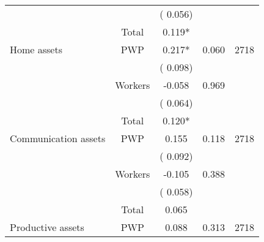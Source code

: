 \begin{tabular}{l*{4}{c}}
                               &                               &       (       0.056)                     & &                                                                             \\ 
\cmidrule{2-3}
                               &       Total           &              0.119*                 &    &                                               \\ 
\cmidrule{2-3}
 Home assets                 &       PWP     &              0.217*               &       0.060    & 2718                              \\ 
                               &                               &       (       0.098)                     & &                                                                             \\ 
                               &       Workers         &             -0.058               &        0.969   &                                               \\ 
                               &                               &       (       0.064)                     & &                                                                             \\ 
\cmidrule{2-3}
                               &       Total           &              0.120*                 &    &                                               \\ 
\cmidrule{2-3}
 Communication assets                 &       PWP     &              0.155               &        0.118   & 2718                              \\ 
                               &                               &       (       0.092)                     & &                                                                             \\ 
                               &       Workers         &             -0.105               &        0.388   &                                               \\ 
                               &                               &       (       0.058)                     & &                                                                             \\ 
\cmidrule{2-3}
                               &       Total           &              0.065                 &    &                                               \\ 
\cmidrule{2-3}
 Productive assets                 &       PWP     &              0.088               &        0.313   & 2718                              \\ 

\end{tabular}
